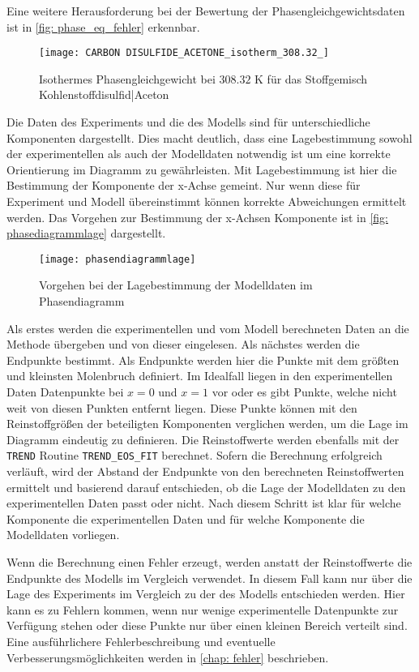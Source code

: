\documentclass[../thesis.tex]{subfiles}
\begin{document}
Eine weitere Herausforderung bei der Bewertung der Phasengleichgewichtsdaten ist in \autoref{fig: phase_eq_fehler} erkennbar. 

\begin{figure}[htb]
	\centering
	\texttt{[image: CARBON DISULFIDE\_ACETONE\_isotherm\_308.32\_]}
	\caption{Isothermes Phasengleichgewicht bei $ 308$.$32$ K für das Stoffgemisch Kohlenstoffdisulfid|Aceton}
	\label{fig: phase_eq_fehler}
\end{figure}

Die Daten des Experiments und die des Modells sind für unterschiedliche Komponenten dargestellt. Dies macht deutlich, dass eine Lagebestimmung sowohl der experimentellen als auch der Modelldaten notwendig ist um eine korrekte Orientierung im Diagramm zu gewährleisten. Mit Lagebestimmung ist hier die Bestimmung der Komponente der x-Achse gemeint. Nur wenn diese für Experiment und Modell übereinstimmt können korrekte Abweichungen ermittelt werden. Das Vorgehen zur Bestimmung der x-Achsen Komponente ist in \autoref{fig: phasediagrammlage} dargestellt.

\begin{figure}[htb]
	\centering
	\texttt{[image: phasendiagrammlage]}
	\caption{Vorgehen bei der Lagebestimmung der Modelldaten im Phasendiagramm}
	\label{fig: phasediagrammlage}
\end{figure}

Als erstes werden die experimentellen und vom Modell berechneten Daten an die Methode übergeben und von dieser eingelesen. Als nächstes werden die Endpunkte bestimmt. Als Endpunkte werden hier die Punkte mit dem größten und kleinsten Molenbruch definiert. Im Idealfall liegen in den experimentellen Daten Datenpunkte bei $x = 0$ und $ x = 1$ vor oder es gibt Punkte, welche nicht weit von diesen Punkten entfernt liegen. Diese Punkte können mit den Reinstoffgrößen der beteiligten Komponenten verglichen werden, um die Lage im Diagramm eindeutig zu definieren. Die Reinstoffwerte werden ebenfalls mit der \texttt{TREND} Routine \texttt{TREND\_EOS\_FIT} berechnet. Sofern die Berechnung erfolgreich verläuft, wird der Abstand der Endpunkte von den berechneten Reinstoffwerten ermittelt und basierend darauf entschieden, ob die Lage der  Modelldaten zu den experimentellen Daten passt oder nicht. Nach diesem Schritt ist klar für welche Komponente die experimentellen Daten und für welche Komponente die Modelldaten vorliegen. 

Wenn die Berechnung einen Fehler erzeugt, werden anstatt der Reinstoffwerte die Endpunkte des Modells im Vergleich verwendet. In diesem Fall kann nur über die Lage des Experiments im Vergleich zu der des Modells entschieden werden. Hier kann es zu Fehlern kommen, wenn nur wenige experimentelle Datenpunkte zur Verfügung stehen oder diese Punkte nur über einen kleinen Bereich verteilt sind. Eine ausführlichere Fehlerbeschreibung und eventuelle Verbesserungsmöglichkeiten werden in \autoref{chap: fehler} beschrieben. 
\end{document}
